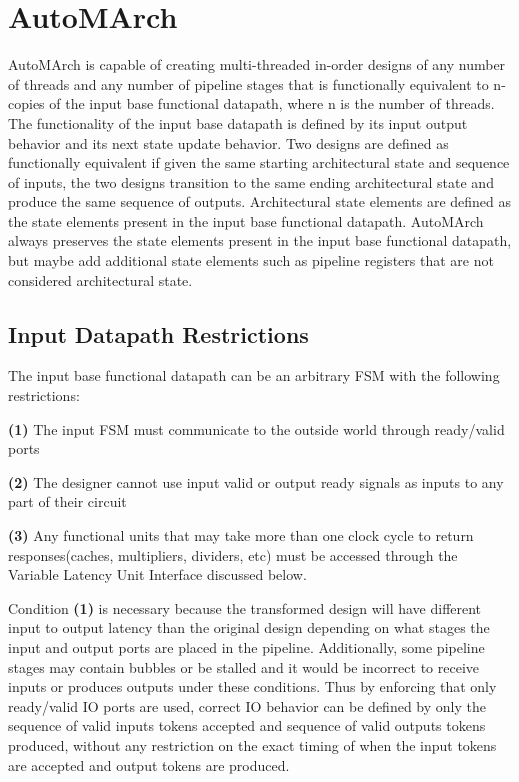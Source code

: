 \section{AutoMArch}
AutoMArch is capable of creating multi-threaded in-order designs of any number of threads and any number of pipeline stages that is functionally equivalent to n-copies of the input base functional datapath, where n is the number of threads. The functionality of the input base datapath is defined by its input output behavior and its next state update behavior. Two designs are defined as functionally equivalent if given the same starting architectural state and sequence of inputs, the two designs transition to the same ending architectural state and produce the same sequence of outputs. Architectural state elements are defined as the state elements present in the input base functional datapath. AutoMArch always preserves the state elements present in the input base functional datapath, but maybe add additional state elements such as pipeline registers that are not considered architectural state.

\subsection{Input Datapath Restrictions}
The input base functional datapath can be an arbitrary FSM with the following restrictions:

{\bf (1)} The input FSM must communicate to the outside world through ready/valid ports  

{\bf (2)} The designer cannot use input valid or output ready signals as inputs to any part of their circuit

{\bf (3)} Any functional units that may take more than one clock cycle to return responses(caches, multipliers, dividers, etc) must be accessed through the Variable Latency Unit Interface discussed below.

Condition {\bf (1)} is necessary because the transformed design will have different input to output latency than the original design depending on what stages the input and output ports are placed in the pipeline. Additionally, some pipeline stages may contain bubbles or be stalled and it would be incorrect to receive inputs or produces outputs under these conditions. Thus by enforcing that only ready/valid IO ports are used, correct IO behavior can be defined by only the sequence of valid inputs tokens accepted and sequence of valid outputs tokens produced, without any restriction on the exact timing of when the input tokens are accepted and output tokens are produced.

